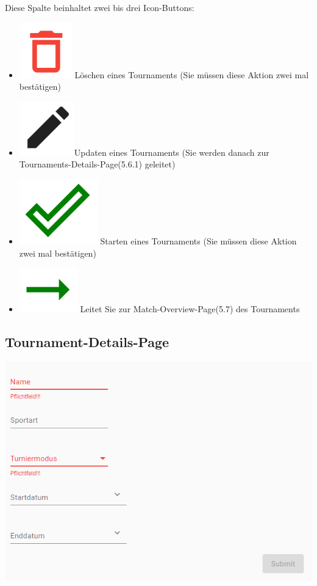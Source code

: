 Diese Spalte beinhaltet zwei bis drei Icon-Buttons:
\begin{itemize}
    \item \includegraphics[scale=0.3]{pics/user-guide/delete-icon.PNG} Löschen eines Tournaments (Sie müssen diese Aktion zwei mal bestätigen)
    \item \includegraphics[scale=0.3]{pics/user-guide/edit-icon.PNG}Updaten eines Tournaments (Sie werden danach zur Tournaments-Details-Page(5.6.1) geleitet)
    \item \includegraphics[scale=0.3]{pics/user-guide/submit-icon.PNG} Starten eines Tournaments (Sie müssen diese Aktion zwei mal bestätigen)
    \item \includegraphics[scale=0.3]{pics/user-guide/go-to-icon.PNG} Leitet Sie zur Match-Overview-Page(5.7) des Tournaments
\end{itemize}

\subsection{Tournament-Details-Page}
\includegraphics[scale=0.6]{pics/user-guide/tournament-create-page.PNG}

